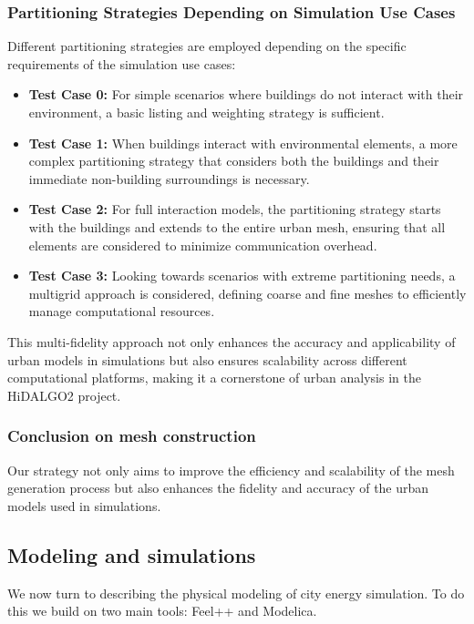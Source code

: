 \documentclass[runningheads]{llncs}
\begin{document}
\subsubsection{Partitioning Strategies Depending on Simulation Use Cases}
Different partitioning strategies are employed depending on the specific requirements of the simulation use cases:
\begin{itemize}
    \item \textbf{Test Case 0:} For simple scenarios where buildings do not interact with their environment, a basic listing and weighting strategy is sufficient.
    \item \textbf{Test Case 1:} When buildings interact with environmental elements, a more complex partitioning strategy that considers both the buildings and their immediate non-building surroundings is necessary.
    \item \textbf{Test Case 2:} For full interaction models, the partitioning strategy starts with the buildings and extends to the entire urban mesh, ensuring that all elements are considered to minimize communication overhead.
    \item \textbf{Test Case 3:} Looking towards scenarios with extreme partitioning needs, a multigrid approach is considered, defining coarse and fine meshes to efficiently manage computational resources.
\end{itemize}

This multi-fidelity approach not only enhances the accuracy and applicability of urban models in simulations but also ensures scalability across different computational platforms, making it a cornerstone of urban analysis in the HiDALGO2 project.

\subsubsection{Conclusion on mesh construction}
Our strategy not only aims to improve the efficiency and scalability of the mesh generation process but also enhances the fidelity and accuracy of the urban models used in simulations.

\subsection{Modeling and simulations}

We now turn to describing the physical modeling of  city energy simulation.
To do this we build on two main tools: Feel++ and Modelica. 
\end{document}
